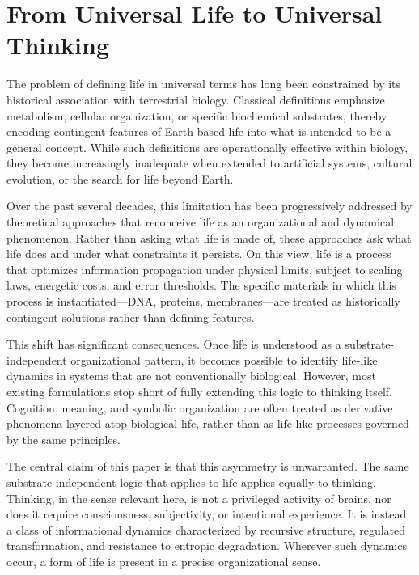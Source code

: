 \documentclass[11pt,oneside]{article}
\begin{document}
\section{From Universal Life to Universal Thinking}

The problem of defining life in universal terms has long been constrained by its historical association with terrestrial biology. Classical definitions emphasize metabolism, cellular organization, or specific biochemical substrates, thereby encoding contingent features of Earth-based life into what is intended to be a general concept. While such definitions are operationally effective within biology, they become increasingly inadequate when extended to artificial systems, cultural evolution, or the search for life beyond Earth.

Over the past several decades, this limitation has been progressively addressed by theoretical approaches that reconceive life as an organizational and dynamical phenomenon. Rather than asking what life is made of, these approaches ask what life does and under what constraints it persists. On this view, life is a process that optimizes information propagation under physical limits, subject to scaling laws, energetic costs, and error thresholds. The specific materials in which this process is instantiated—DNA, proteins, membranes—are treated as historically contingent solutions rather than defining features.

This shift has significant consequences. Once life is understood as a substrate-independent organizational pattern, it becomes possible to identify life-like dynamics in systems that are not conventionally biological. However, most existing formulations stop short of fully extending this logic to thinking itself. Cognition, meaning, and symbolic organization are often treated as derivative phenomena layered atop biological life, rather than as life-like processes governed by the same principles.

The central claim of this paper is that this asymmetry is unwarranted. The same substrate-independent logic that applies to life applies equally to thinking. Thinking, in the sense relevant here, is not a privileged activity of brains, nor does it require consciousness, subjectivity, or intentional experience. It is instead a class of informational dynamics characterized by recursive structure, regulated transformation, and resistance to entropic degradation. Wherever such dynamics occur, a form of life is present in a precise organizational sense.
\end{document}
